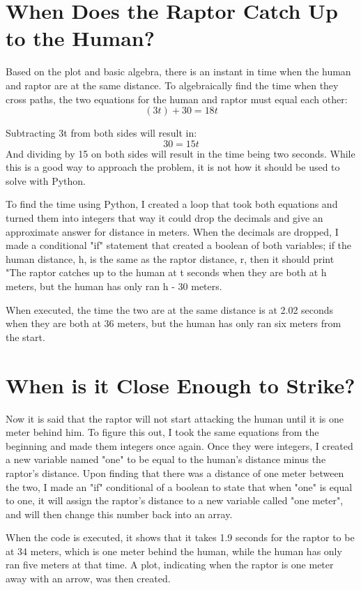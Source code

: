 \documentclass[twocolumn]{revtex4}
\begin{document}
\section{When Does the Raptor Catch Up to the Human?}
Based on the plot and basic algebra, there is an instant in time when the human and raptor are at the same distance. To algebraically find the time when they cross paths, the two equations for the human and raptor must equal each other:
$$(3t) + 30 = 18t$$

Subtracting 3t from both sides will result in:
$$30 = 15t$$
And dividing by 15 on both sides will result in the time being two seconds. While this is a good way to approach the problem, it is not how it should be used to solve with Python.

To find the time using Python, I created a loop that took both equations and turned them into integers that way it could drop the decimals and give an approximate answer for distance in meters. When the decimals are dropped, I made a conditional "if" statement that created a boolean of both variables; if the human distance, h, is the same as the raptor distance, r, then it should print "The raptor catches up to the human at t seconds when they are both at h meters, but the human has only ran h - 30 meters.

When executed, the time the two are at the same distance is at 2.02 seconds when they are both at 36 meters, but the human has only ran six meters from the start.

\section{When is it Close Enough to Strike?}
Now it is said that the raptor will not start attacking the human until it is one meter behind him. To figure this out, I took the same equations from the beginning and made them integers once again. Once they were integers, I created a new variable named "one" to be equal to the human's distance minus the raptor's distance. Upon finding that there was a distance of one meter between the two, I made an "if" conditional of a boolean to state that when "one" is equal to one, it will assign the raptor's distance to a new variable called "one meter", and will then change this number back into an array.

When the code is executed, it shows that it takes 1.9 seconds for the raptor to be at 34 meters, which is one meter behind the human, while the human has only ran five meters at that time. A plot, indicating when the raptor is one meter away with an arrow, was then created.
\end{document}
